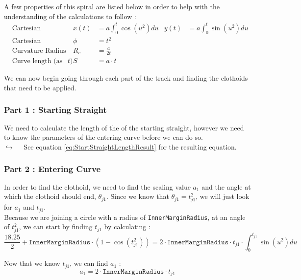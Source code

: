 \documentclass[a4paper, 11pt]{article}
\begin{document}
A few properties of this spiral are listed below in order to help with the understanding of the calculations to follow :
\begin{align*}
	&\text{Cartesian Parametrisation :} & x(t) &= a\int_0^t \cos\left(u^2 \right)du & y(t) &= a\int_0^t \sin\left(u^2 \right)du\\
	&\text{Cartesian Tangential Angle :} & \phi &= t^2\\
	&\text{Curvature Radius :} & R_c &= \frac{a}{2t}\\
	&\text{Curve length (as a function of $t$) :} & S &= a\cdot t
\end{align*}

We can now begin going through each part of the track and finding the clothoids that need to be applied.

\subsubsection{Part 1 : Starting Straight}
We need to calculate the length of the of the starting straight, however we need to know the parameters of the entering curve before we can do so.\\

$\hookrightarrow\quad$ See equation \ref{eq:StartStraightLengthResult} for the resulting equation.

\subsubsection{Part 2 : Entering Curve}
In order to find the clothoid, we need to find the scaling value $a_1$ and the angle at which the clothoid should end, $\theta_{j1}$. Since we know that $\theta_{j1} = t_{j1}^2$, we will just look for $a_1$ and $t_{j1}$.\\

Because we are joining a circle with a radius of \texttt{InnerMarginRadius}, at an angle of $t_{j1}^2$, we can start by finding $t_{j1}$ by calculating :
\begin{equation}
	\frac{18.25}{2} + \texttt{InnerMarginRadius}\cdot\left(1 - \cos\left(t_{j1}^2 \right) \right) =  2\cdot \texttt{InnerMarginRadius}\cdot t_{j1} \cdot \int_0^{t_{j1}} \sin\left(u^2 \right)du
\end{equation}

Now that we know $t_{j1}$, we can find $a_1$ :
\begin{equation}
	a_1 = 2 \cdot \texttt{InnerMarginRadius} \cdot t_{j1}
\end{equation}
\end{document}
